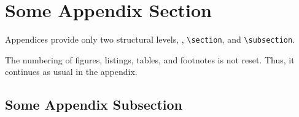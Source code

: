 \section{Some Appendix Section}\label{sec:appendix01}
Appendices provide only two structural levels, \viz, \texttt{\textbackslash section}, and \texttt{\textbackslash subsection}.

The numbering of figures, listings, tables, and footnotes is not reset. Thus, it continues as usual in the appendix.

\subsection{Some Appendix Subsection}

\lipsum[10]
